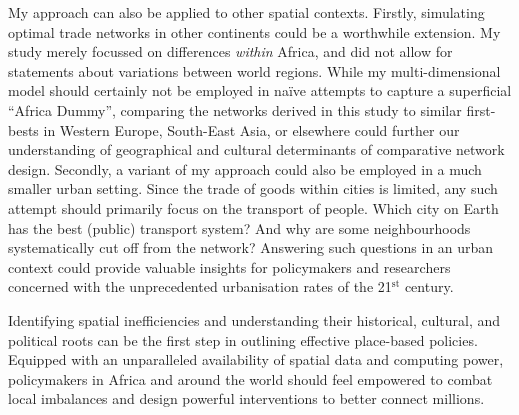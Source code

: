 \documentclass[11pt, oneside]{article}   	%
\begin{document}
My approach can also be applied to other spatial contexts. Firstly, simulating optimal trade networks in other continents could be a worthwhile extension. My study merely focussed on differences \emph{within} Africa, and did not allow for statements about variations between world regions. While my multi-dimensional model should certainly not be employed in naïve attempts to capture a superficial ``Africa Dummy'', comparing the networks derived in this study to similar first-bests in Western Europe, South-East Asia, or elsewhere could further our understanding of geographical and cultural determinants of comparative network design. Secondly, a variant of my approach could also be employed in a much smaller urban setting. Since the trade of goods within cities is limited, any such attempt should primarily focus on the transport of people. Which city on Earth has the best (public) transport system? And why are some neighbourhoods systematically cut off from the network? Answering such questions in an urban context could provide valuable insights for policymakers and researchers concerned with the unprecedented urbanisation rates of the 21$^{\textrm{st}}$ century.

Identifying spatial inefficiencies and understanding their historical, cultural, and political roots can be the first step in outlining effective place-based policies. Equipped with an unparalleled availability of spatial data and computing power, policymakers in Africa and around the world should feel empowered to combat local imbalances and design powerful interventions to better connect millions.


\newpage
\begin{spacing}{0.8}
\setlength{\bibsep}{2.5pt plus 1.5ex}

\end{spacing}




  \newpage


  \renewcommand{\thesubsection}{\Alph{subsection}}
  \appendix
  \renewcommand{\thefigure}{A.\arabic{figure}}
  \setcounter{figure}{0}
  \renewcommand{\thetable}{A.\arabic{table}}
  \setcounter{table}{0}
  \renewcommand{\theequation}{A.\arabic{equation}}
  \setcounter{equation}{0}
  \renewcommand{\thefootnote}{A.\arabic{footnote}}
  \setcounter{footnote}{0}
\end{document}
